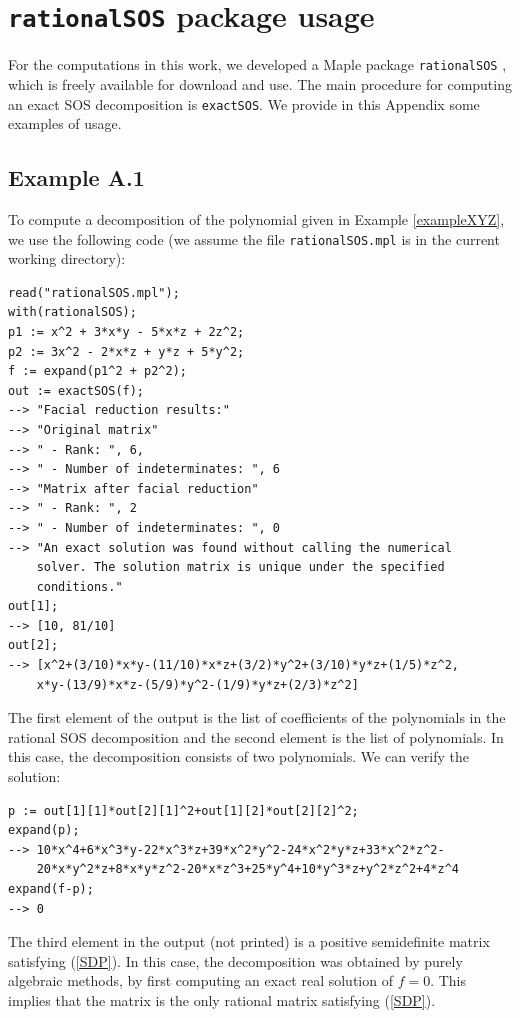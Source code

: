\documentclass{amsart}
\theoremstyle{definition}
\theoremstyle{remark}
\numberwithin{equation}{section}
\begin{document}
\appendix
\section{\texttt{rationalSOS} package usage}
\label{appendix:usage}
For the computations in this work, we developed a Maple package \texttt{rationalSOS} \cite{rationalSOS}, which is freely available for download and use. The main procedure for computing an exact SOS decomposition is \texttt{exactSOS}. We provide in this Appendix some examples of usage.

\subsection*{Example A.1}
To compute a decomposition of the polynomial given in Example \ref{exampleXYZ}, we use the following code (we assume the file \texttt{rationalSOS.mpl} is in the current working directory):

\begin{verbatim}
read("rationalSOS.mpl");
with(rationalSOS);
p1 := x^2 + 3*x*y - 5*x*z + 2z^2;
p2 := 3x^2 - 2*x*z + y*z + 5*y^2;
f := expand(p1^2 + p2^2);
out := exactSOS(f);
--> "Facial reduction results:"
--> "Original matrix"
--> " - Rank: ", 6,
--> " - Number of indeterminates: ", 6
--> "Matrix after facial reduction"
--> " - Rank: ", 2
--> " - Number of indeterminates: ", 0
--> "An exact solution was found without calling the numerical
    solver. The solution matrix is unique under the specified
    conditions."
out[1];
--> [10, 81/10]
out[2];
--> [x^2+(3/10)*x*y-(11/10)*x*z+(3/2)*y^2+(3/10)*y*z+(1/5)*z^2,
    x*y-(13/9)*x*z-(5/9)*y^2-(1/9)*y*z+(2/3)*z^2]
\end{verbatim}

The first element of the output is the list of coefficients of the polynomials in the rational SOS decomposition and the second element is the list of polynomials. In this case, the decomposition consists of two polynomials. We can verify the solution:
\begin{verbatim}
p := out[1][1]*out[2][1]^2+out[1][2]*out[2][2]^2;
expand(p);
--> 10*x^4+6*x^3*y-22*x^3*z+39*x^2*y^2-24*x^2*y*z+33*x^2*z^2-
    20*x*y^2*z+8*x*y*z^2-20*x*z^3+25*y^4+10*y^3*z+y^2*z^2+4*z^4
expand(f-p);
--> 0
\end{verbatim}

The third element in the output (not printed) is a positive semidefinite matrix satisfying (\ref{SDP}). In this case, the decomposition was obtained by purely algebraic methods, by first computing an exact real solution of $f = 0$. This implies that the matrix is the only rational matrix satisfying (\ref{SDP}).
\end{document}
